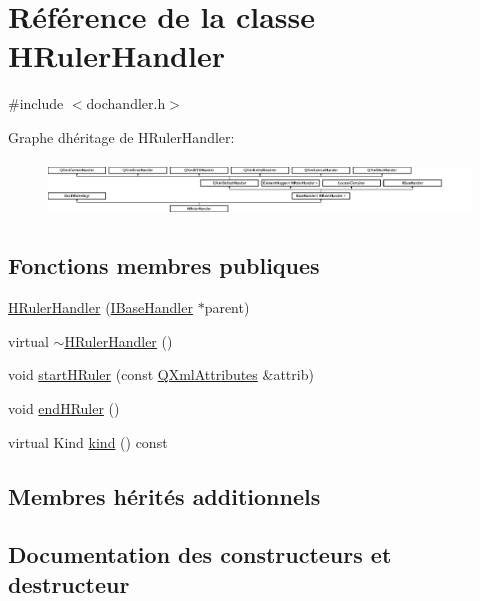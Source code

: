 \hypertarget{class_h_ruler_handler}{}\section{Référence de la classe H\+Ruler\+Handler}
\label{class_h_ruler_handler}


{\ttfamily \#include $<$dochandler.\+h$>$}

Graphe d\textquotesingle{}héritage de H\+Ruler\+Handler\+:\begin{figure}[H]
\begin{center}
\leavevmode
\includegraphics[height=1.481482cm]{class_h_ruler_handler}
\end{center}
\end{figure}
\subsection*{Fonctions membres publiques}
\begin{DoxyCompactItemize}
\item 
\hyperlink{class_h_ruler_handler_a19eb453c8d1d2fbfffc5a8f0f5cf8790}{H\+Ruler\+Handler} (\hyperlink{class_i_base_handler}{I\+Base\+Handler} $\ast$parent)
\item 
virtual \hyperlink{class_h_ruler_handler_a998aa181bee1408050765e3c3b49cab6}{$\sim$\+H\+Ruler\+Handler} ()
\item 
void \hyperlink{class_h_ruler_handler_a099ec48d57adb88fd8cd0804b725e34f}{start\+H\+Ruler} (const \hyperlink{class_q_xml_attributes}{Q\+Xml\+Attributes} \&attrib)
\item 
void \hyperlink{class_h_ruler_handler_a6b417768b7b9433b8ab8c4bb77a07bd7}{end\+H\+Ruler} ()
\item 
virtual Kind \hyperlink{class_h_ruler_handler_a73a0eef155d4ed756b4b9f0e71d119c1}{kind} () const 
\end{DoxyCompactItemize}
\subsection*{Membres hérités additionnels}


\subsection{Documentation des constructeurs et destructeur}
\hypertarget{class_h_ruler_handler_a19eb453c8d1d2fbfffc5a8f0f5cf8790}{}

